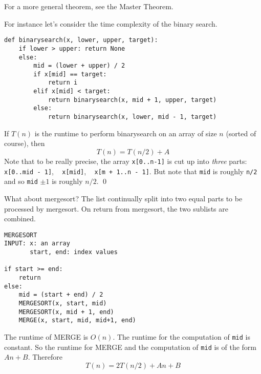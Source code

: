 For a more general theorem, see the Master Theorem.

\begin{eg}
For instance let's consider the time complexity of the binary search.
\begin{Verbatim}[frame=single,fontsize=\footnotesize]
def binarysearch(x, lower, upper, target):
    if lower > upper: return None
    else:
        mid = (lower + upper) / 2
        if x[mid] == target:
            return i
        elif x[mid] < target:
            return binarysearch(x, mid + 1, upper, target)
        else:
            return binarysearch(x, lower, mid - 1, target)
\end{Verbatim}
If $T(n)$ is the runtime to perform binarysearch on an
array of size $n$ (sorted of course), 
then 
\[
T(n) = T(n/2) + A
\]
Note that to be really precise, the array
\verb!x[0..n-1]! is cut up into
\textit{three} parts:
\verb!x[0..mid - 1]!, \,\,\,
\verb!x[mid]!, \,\,\,
\verb!x[m + 1..n - 1]!.
But note that \verb!mid! is roughly \verb!n/2! and so
\verb!mid! $\pm 1$ is roughly
$n/2$.
\qed
\end{eg}


\begin{eg}
What about mergesort? The list continually split into two equal parts
to be processed by mergesort. On return from mergesort, the two sublists
are combined.
\begin{Verbatim}[frame=single,fontsize=\footnotesize]
MERGESORT
INPUT: x: an array
       start, end: index values

if start >= end:
    return
else:
    mid = (start + end) / 2
    MERGESORT(x, start, mid)
    MERGESORT(x, mid + 1, end)
    MERGE(x, start, mid, mid+1, end)
\end{Verbatim}
The runtime of MERGE is $O(n)$.
The runtime for the computation of \verb!mid!
is constant.
So the runtime for MERGE and the computation of \verb!mid! is
of the form $An + B$.
Therefore
\[
T(n) = 2T(n/2) + An + B
\]
\end{eg}

